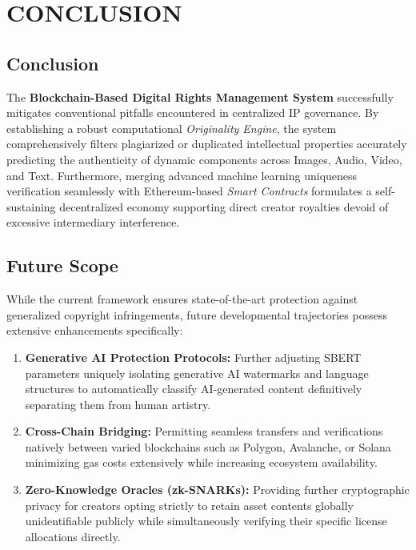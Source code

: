 \documentclass[12pt,a4paper]{report}
\begin{document}
\chapter{CONCLUSION}

\section{Conclusion}
The \textbf{Blockchain-Based Digital Rights Management System} successfully mitigates conventional pitfalls encountered in centralized IP governance. By establishing a robust computational \textit{Originality Engine}, the system comprehensively filters plagiarized or duplicated intellectual properties accurately predicting the authenticity of dynamic components across Images, Audio, Video, and Text. 
Furthermore, merging advanced machine learning uniqueness verification seamlessly with Ethereum-based \textit{Smart Contracts} formulates a self-sustaining decentralized economy supporting direct creator royalties devoid of excessive intermediary interference.

\section{Future Scope}
While the current framework ensures state-of-the-art protection against generalized copyright infringements, future developmental trajectories possess extensive enhancements specifically:
\begin{enumerate}
    \item \textbf{Generative AI Protection Protocols:} Further adjusting SBERT parameters uniquely isolating generative AI watermarks and language structures to automatically classify AI-generated content definitively separating them from human artistry.
    \item \textbf{Cross-Chain Bridging:} Permitting seamless transfers and verifications natively between varied blockchains such as Polygon, Avalanche, or Solana minimizing gas costs extensively while increasing ecosystem availability.
    \item \textbf{Zero-Knowledge Oracles (zk-SNARKs):} Providing further cryptographic privacy for creators opting strictly to retain asset contents globally unidentifiable publicly while simultaneously verifying their specific license allocations directly.
\end{enumerate}
\end{document}
